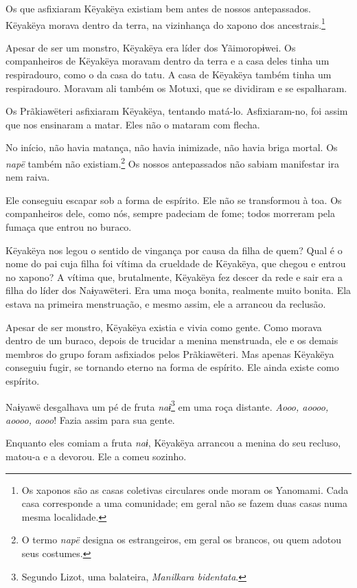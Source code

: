 Os que asfixiaram Këyakëya existiam bem antes de nossos antepassados.
Këyakëya morava dentro da terra, na vizinhança do xapono dos
ancestrais.\footnote{Os xaponos são as casas coletivas circulares onde moram os Yanomami. Cada casa corresponde a uma comunidade; em geral não se fazem duas casas numa mesma localidade.} 

Apesar de ser um monstro, Këyakëya era líder dos Yãimoropɨwei. Os
companheiros de Këyakëya moravam dentro da terra e a casa deles tinha um
respiradouro, como o da casa do tatu. A casa de Këyakëya também tinha um
respiradouro. Moravam ali também os Motuxi, que se dividiram e se
espalharam. 

Os Prãkiawëteri asfixiaram Këyakëya, tentando matá-lo. Asfixiaram-no,
foi assim que nos ensinaram a matar. Eles não o mataram com flecha. 

No início, não havia matança, não havia inimizade, não havia briga
mortal. Os \textit{napë} também não existiam.\footnote{O termo \textit{napë} designa os estrangeiros, em geral os brancos, ou quem adotou seus costumes.} Os nossos antepassados não sabiam manifestar ira nem raiva. 

Ele conseguiu escapar sob a forma de espírito. Ele não se transformou à
toa. Os companheiros dele, como nós, sempre padeciam de fome; todos
morreram pela fumaça que entrou no buraco. 

Këyakëya nos legou o sentido de vingança por causa da filha de quem?
Qual é o nome do pai cuja filha foi vítima da crueldade de Këyakëya, que
chegou e entrou no xapono? A vítima que, brutalmente, Këyakëya fez
descer da rede e sair era a filha do líder dos Naɨyawëteri. Era uma moça
bonita, realmente muito bonita. Ela estava na primeira menstruação, e
mesmo assim, ele a arrancou da reclusão.

Apesar de ser monstro, Këyakëya existia e vivia como gente. Como
morava dentro de um buraco, depois de trucidar a menina menstruada, ele
e os demais membros do grupo foram asfixiados pelos Prãkiawëteri. Mas
apenas Këyakëya conseguiu fugir, se tornando eterno na forma de
espírito. Ele ainda existe como espírito. 

Naɨyawë desgalhava um pé de fruta \textit{naɨ}\footnote{ Segundo Lizot, uma balateira, \textit{Manilkara bidentata}.} em uma roça
distante. \textit{Aooo, aoooo, aoooo, aooo}! Fazia assim para sua gente. 

Enquanto eles comiam a fruta \textit{naɨ}, Këyakëya arrancou a menina do
seu recluso, matou-a e a devorou. Ele a comeu sozinho. 

